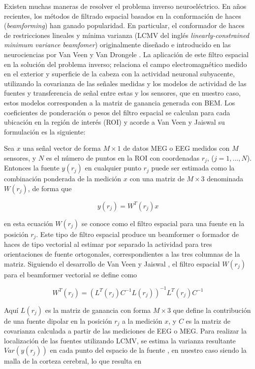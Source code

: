 Existen muchas maneras de resolver el problema inverso neuroeléctrico. En años recientes, los métodos de filtrado espacial basados en la conformación de haces (\emph{beamforming}) han ganado popularidad. En particular, el conformador de haces de restricciones lineales y mínima varianza (LCMV del inglés \emph{linearly-constrained minimum variance beamfomer}) originalmente diseñado e introducido en las neurociencias por Van Veen y Van Drongele \cite{VanVeen1988, VanVeen1997}. La aplicación de este filtro espacial en la solución del problema inverso; relaciona el campo electromagnético medido en el exterior y superficie de la cabeza con la actividad neuronal subyacente, utilizando la covarianza de las señales medidas y los modelos de actividad de las fuentes y transferencia de señal entre estas y los sensores, que en nuestro caso, estos modelos corresponden a la matriz de ganancia generada con BEM. Los coeficientes de ponderación o pesos del filtro espacial se calculan para cada ubicación en la región de interés (ROI) y acorde a Van Veen y Jaiswal \cite{VanVeen1997,Jaiswal2020} su formulación es la siguiente:

Sea $x$ una señal vector de forma $M \times 1$ de datos MEG o EEG medidos con $M$ sensores, y $N$ es el número de puntos en la ROI con coordenadas $r_j$, ($j = 1, ..., N$). Entonces la fuente $y(r_j)$ en cualquier punto $r_j$ puede ser estimada como la combinación ponderada de la medición $x$ con una matriz de $M \times 3$ denominada $W(r_j)$, de forma que

\begin{equation}
	\label{beamformer}
y(r_j) = W^{T}(r_j)x
\end{equation}

en esta ecuación $W(r_j)$ se conoce como el filtro espacial para una fuente en la posición $r_j$. Este tipo de filtro espacial produce un beamformer o formador de haces de tipo vectorial al estimar por separado la actividad para tres orientaciones de fuente ortogonales, correspondientes a las tres columnas de la matriz. Siguiendo el desarrollo de Van Veen y Jaiswal \cite{VanVeen1997,Jaiswal2020}, el filtro espacial $W(r_j)$ para el beamformer vectorial se define como

\begin{equation}
	\label{beamformer2}
W^{T}(r_j) = (L^{T}(r_j)C^{-1}L(r_j))^{-1}L^{T}(r_j)C^{-1}
\end{equation}

Aquí $L(r_j)$ es la matriz de ganancia con forma $M \times 3$ que define la contribución de una fuente dipolar en la posición $r_j$ a la medición $x$, y $C$ es la matriz de covarianza calculada a partir de las mediciones de EEG o MEG. Para realizar la localización de las fuentes utilizando LCMV, se estima la varianza resultante $Var(y(r_j))$ en cada punto del espacio de la fuente \cite{VanVeen1997,Jaiswal2020}, en nuestro caso siendo la malla de la corteza cerebral, lo que resulta en


